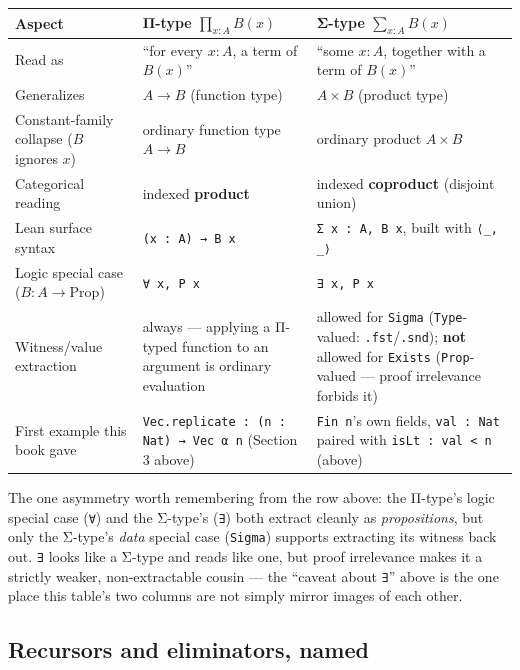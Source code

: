 {\small\begin{tabular}{
  >{\raggedright\arraybackslash}p{}
  >{\raggedright\arraybackslash}p{}
  >{\raggedright\arraybackslash}p{}
}
\toprule
Aspect & Π-type \(\prod_{x:A} B(x)\) & Σ-type \(\sum_{x:A} B(x)\) \\
\midrule
Read as & ``for every \(x:A\), a term of \(B(x)\)'' & ``some \(x:A\), together with a term of \(B(x)\)'' \\
Generalizes & \(A \to B\) (function type) & \(A \times B\) (product type) \\
Constant-family collapse (\(B\) ignores \(x\)) & ordinary function type \(A \to B\) & ordinary product \(A \times B\) \\
Categorical reading & indexed \textbf{product} & indexed \textbf{coproduct} (disjoint union) \\
Lean surface syntax & \texttt{(x : A) → B x} & \texttt{Σ x : A, B x}, built with \texttt{⟨\_\allowbreak{}, \_\allowbreak{}⟩} \\
Logic special case (\(B : A \to \mathrm{Prop}\)) & \texttt{∀ x, P x} & \texttt{∃ x, P x} \\
Witness/value extraction & always --- applying a Π-typed function to an argument is ordinary evaluation & allowed for \texttt{Sigma} (\texttt{Type}-valued: \texttt{.fst}/\texttt{.snd}); \textbf{not} allowed for \texttt{Exists} (\texttt{Prop}-valued --- proof irrelevance forbids it) \\
First example this book gave & \texttt{Vec.replicate : (n : Nat) → Vec α n} (Section 3 above) & \texttt{Fin n}'s own fields, \texttt{val : Nat} paired with \texttt{isLt : val < n} (above) \\
\bottomrule
\end{tabular}}


The one asymmetry worth remembering from the row above: the Π-type's logic special case (\texttt{∀}) and the Σ-type's (\texttt{∃}) both extract cleanly as \emph{propositions}, but only the Σ-type's \emph{data} special case (\texttt{Sigma}) supports extracting its witness back out. \texttt{∃} looks like a Σ-type and reads like one, but proof irrelevance makes it a strictly weaker, non-extractable cousin --- the ``caveat about \texttt{∃}'' above is the one place this table's two columns are not simply mirror images of each other.

\subsection{Recursors and eliminators, named}\label{sec:01-basics:05-pi-sigma-and-coc:7}

